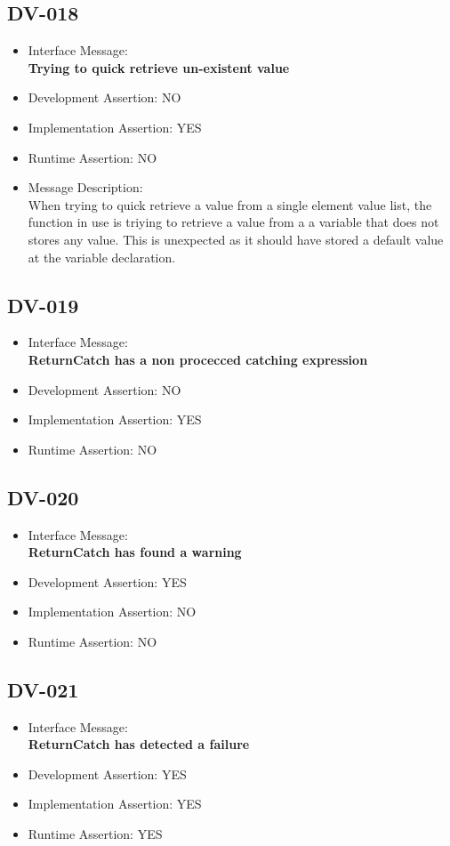 \subsection{DV-018}
\begin{itemize}
  \item Interface Message:\\[1em]
    \textbf{Trying to quick retrieve un-existent value}
  \item Development Assertion: NO
  \item Implementation Assertion: YES
  \item Runtime Assertion: NO
  \item Message Description:\\[1em]
    When trying to quick retrieve a value from a single element value list, the function in use is triying to retrieve a value from a a variable that does not stores any value. This is unexpected as it should have stored a default value at the variable declaration.
\end{itemize}

\subsection{DV-019}
\begin{itemize}
  \item Interface Message:\\[1em]
    \textbf{ReturnCatch has a non procecced catching expression}
  \item Development Assertion: NO
  \item Implementation Assertion: YES
  \item Runtime Assertion: NO
\end{itemize}

\subsection{DV-020}
\begin{itemize}
  \item Interface Message:\\[1em]
    \textbf{ReturnCatch has found a warning}
  \item Development Assertion: YES
  \item Implementation Assertion: NO
  \item Runtime Assertion: NO
\end{itemize}

\subsection{DV-021}
\begin{itemize}
  \item Interface Message:\\[1em]
    \textbf{ReturnCatch has detected a failure}
  \item Development Assertion: YES
  \item Implementation Assertion: YES
  \item Runtime Assertion: YES
\end{itemize}

